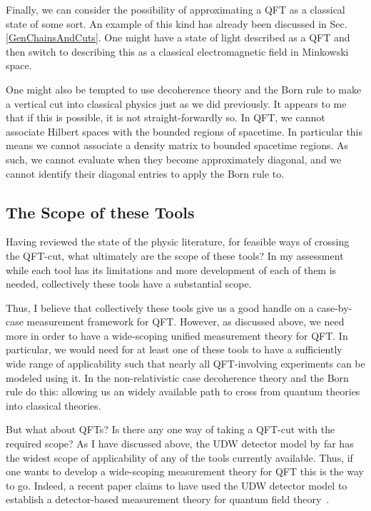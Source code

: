 \documentclass[12pt,prd,superscriptaddress,floatfix,amsmath,amssymb,amsfonts,nofootinbib]{revtex4-2}
\begin{document}
Finally, we can consider the possibility of approximating a QFT as a classical state of some sort. An example of this kind has already been discussed in Sec. \ref{GenChainsAndCuts}. One might have a state of light described as a QFT and then switch to describing this as a classical electromagnetic field in Minkowski space.

One might also be tempted to use decoherence theory and the Born rule to make a vertical cut into classical physics just as we did previously. It appears to me that if this is possible, it is not straight-forwardly so. In QFT, we cannot associate Hilbert spaces with the bounded regions of spacetime. In particular this means we cannot associate a density matrix to bounded spacetime regions. As such, we cannot evaluate when they become approximately diagonal, and we cannot identify their diagonal entries to apply the Born rule to.

\subsection{The Scope of these Tools}
Having reviewed the state of the physic literature, for feasible ways of crossing the QFT-cut, what ultimately are the scope of these tools? In my assessment while each tool has its limitations and more development of each of them is needed, collectively these tools have a substantial scope.

Thus, I believe that collectively these tools give us a good handle on a case-by-case measurement framework for QFT. However, as discussed above, we need more in order to have a wide-scoping unified measurement theory for QFT. In particular, we would need for at least one of these tools to have a sufficiently wide range of applicability such that nearly all QFT-involving experiments can be modeled using it. In the non-relativistic case decoherence theory and the Born rule do this: allowing us an widely available path to cross from quantum theories into classical theories. 

But what about QFTs? Is there any one way of taking a QFT-cut with the required scope? As I have discussed above, the UDW detector model by far has the widest scope of applicability of any of the tools currently available. Thus, if one wants to develop a wide-scoping measurement theory for QFT this is the way to go. Indeed, a recent paper claims to have used the UDW detector model to establish a detector-based measurement theory for quantum field theory~\cite{pologomez2021detectorbased}.
\end{document}
